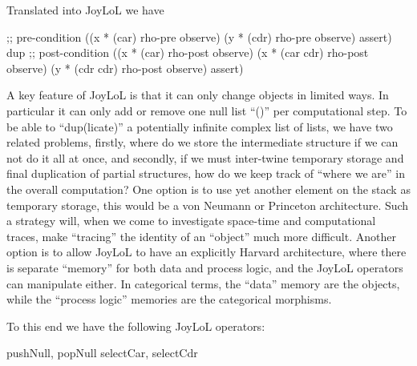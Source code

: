 \documentclass[a4paper,openany]{amsart}
\begin{document}
\begin{prooftree}
\end{prooftree}

Translated into JoyLoL we have
%
\begin{joyLoL}
;; pre-condition
((x * (car) rho-pre observe)
 (y * (cdr) rho-pre observe) assert)
dup
;; post-condition
((x * (car) rho-post observe)
 (x * (car cdr) rho-post observe)
 (y * (cdr cdr) rho-post observe) assert)
\end{joyLoL}

A key feature of JoyLoL is that it can only change objects in limited ways. In
particular it can only add or remove one null list ``()'' per computational
step. To be able to ``dup(licate)'' a potentially infinite complex list of
lists, we have two related problems, firstly, where do we store the intermediate
structure if we can not do it all at once, and secondly, if we must inter-twine
temporary storage and final duplication of partial structures, how do we keep
track of ``where we are'' in the overall computation? One option is to use yet
another element on the stack as temporary storage, this would be a von Neumann
or Princeton architecture. Such a strategy will, when we come to investigate
space-time and computational traces, make ``tracing'' the identity of an
``object'' much more difficult. Another option is to allow JoyLoL to have an
explicitly Harvard architecture, where there is separate ``memory'' for both
data and process logic, and the JoyLoL operators can manipulate either. In
categorical terms, the ``data'' memory are the objects, while the ``process
logic'' memories are the categorical morphisms.

To this end we have the following JoyLoL operators:
%
\begin{joyLoL}
pushNull, popNull
selectCar, selectCdr
\end{joyLoL}

\printbibliography
\end{document}
